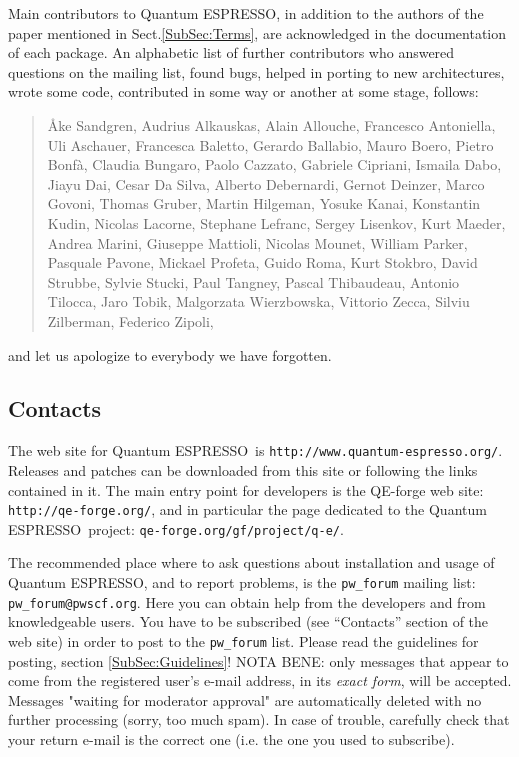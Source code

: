 \documentclass[12pt,a4paper]{article}
\def\qe{{\sc Quantum ESPRESSO}}
\begin{document}
Main contributors to \qe, in addition to the authors of the paper 
mentioned in Sect.\ref{SubSec:Terms}, are acknowledged in the 
documentation of each package. An alphabetic list of further
contributors who answered questions on the mailing list, found 
bugs, helped in porting to new architectures, wrote some code,
contributed in some way or another at some stage, follows:
\begin{quote}
  {\AA}ke Sandgren, Audrius Alkauskas, Alain Allouche, Francesco Antoniella,
  Uli Aschauer,  Francesca Baletto, Gerardo Ballabio, Mauro Boero, Pietro
  Bonf\`a, Claudia Bungaro, Paolo Cazzato, Gabriele Cipriani, Ismaila Dabo,
  Jiayu Dai, Cesar Da Silva, Alberto Debernardi, Gernot Deinzer, Marco Govoni,
  Thomas Gruber, Martin Hilgeman, Yosuke Kanai, Konstantin Kudin,
  Nicolas Lacorne, Stephane Lefranc, Sergey Lisenkov, Kurt Maeder,
  Andrea Marini, Giuseppe Mattioli, Nicolas Mounet, William Parker,
  Pasquale Pavone, Mickael Profeta, Guido Roma, Kurt Stokbro, 
  David Strubbe, Sylvie Stucki, Paul Tangney,  Pascal Thibaudeau, 
  Antonio Tilocca, Jaro Tobik, Malgorzata Wierzbowska, Vittorio Zecca,
  Silviu Zilberman, Federico Zipoli,
\end{quote}
and let us apologize to everybody we have forgotten.
 
\subsection{Contacts}
\label{SubSec:Contacts}

The web site for \qe\ is \texttt{http://www.quantum-espresso.org/}.
Releases and patches can be downloaded from this
site or following the links contained in it. The main entry point for 
developers is the QE-forge web site:
\texttt{http://qe-forge.org/}, and in particular the page dedicated to
the \qe\ project: \texttt{qe-forge.org/gf/project/q-e/}.

The recommended place where to ask questions about installation 
and usage of \qe, and to report problems, is the \texttt{pw\_forum} 
mailing list: \texttt{pw\_forum@pwscf.org}.
Here you can obtain help from the developers and from 
knowledgeable users. You have to be subscribed (see ``Contacts'' 
section of the web site) in order to post to the  \texttt{pw\_forum} 
list. Please read the guidelines for posting, section \ref{SubSec:Guidelines}!
NOTA BENE: only messages that appear to come from the 
registered user's e-mail address, in its {\em exact form}, will be
accepted. Messages "waiting for moderator approval" are
automatically deleted with no further processing (sorry, too 
much spam). In case of trouble, carefully check that your return 
e-mail is the correct one (i.e. the one you used to subscribe).
\end{document}
